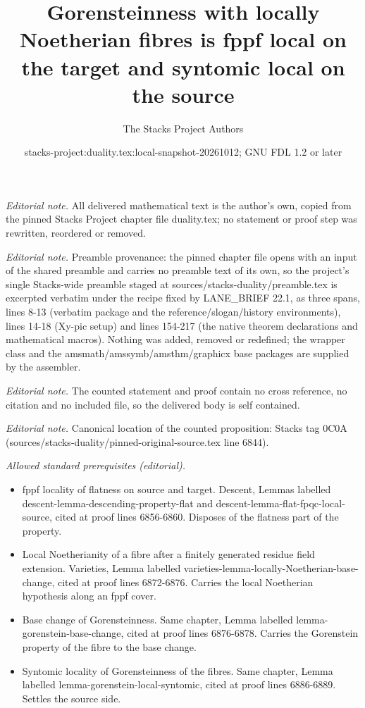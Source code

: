 \documentclass[10pt,a4paper]{amsart}
\title{Gorensteinness with locally Noetherian fibres is fppf local on the target and syntomic local on the source}
\author{The Stacks Project Authors}
\date{stacks-project:duality.tex:local-snapshot-20261012; GNU FDL 1.2 or later}
\theoremstyle{plain}
\theoremstyle{definition}
\theoremstyle{remark}
\numberwithin{equation}{subsection}
\begin{document}
\maketitle
\noindent\textit{Editorial note.} All delivered mathematical text is the author's own, copied from the pinned Stacks Project chapter file duality.tex; no statement or proof step was rewritten, reordered or removed.\par\medskip
\noindent\textit{Editorial note.} Preamble provenance: the pinned chapter file opens with an input of the shared preamble and carries no preamble text of its own, so the project's single Stacks-wide preamble staged at sources/stacks-duality/preamble.tex is excerpted verbatim under the recipe fixed by LANE\_BRIEF 22.1, as three spans, lines 8-13 (verbatim package and the reference/slogan/history environments), lines 14-18 (Xy-pic setup) and lines 154-217 (the native theorem declarations and mathematical macros). Nothing was added, removed or redefined; the wrapper class and the amsmath/amssymb/amsthm/graphicx base packages are supplied by the assembler.\par\medskip
\noindent\textit{Editorial note.} The counted statement and proof contain no cross reference, no citation and no included file, so the delivered body is self contained.\par\medskip
\noindent\textit{Editorial note.} Canonical location of the counted proposition: Stacks tag 0C0A (sources/stacks-duality/pinned-original-source.tex line 6844).\par\medskip
\noindent\textit{Allowed standard prerequisites (editorial).}\begin{itemize}
\item fppf locality of flatness on source and target. Descent, Lemmas labelled descent-lemma-descending-property-flat and descent-lemma-flat-fpqc-local-source, cited at proof lines 6856-6860. Disposes of the flatness part of the property.
\item Local Noetherianity of a fibre after a finitely generated residue field extension. Varieties, Lemma labelled varieties-lemma-locally-Noetherian-base-change, cited at proof lines 6872-6876. Carries the local Noetherian hypothesis along an fppf cover.
\item Base change of Gorensteinness. Same chapter, Lemma labelled lemma-gorenstein-base-change, cited at proof lines 6876-6878. Carries the Gorenstein property of the fibre to the base change.
\item Syntomic locality of Gorensteinness of the fibres. Same chapter, Lemma labelled lemma-gorenstein-local-syntomic, cited at proof lines 6886-6889. Settles the source side.
\end{itemize}\medskip
\end{document}
